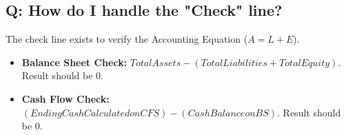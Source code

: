 \documentclass[11pt, letterpaper]{article}
\begin{document}
\subsection{Q: How do I handle the "Check" line?}
The check line exists to verify the Accounting Equation ($A = L + E$).
\begin{itemize}
    \item \textbf{Balance Sheet Check:} $Total Assets - (Total Liabilities + Total Equity)$. Result should be 0.
    \item \textbf{Cash Flow Check:} $(Ending Cash Calculated on CFS) - (Cash Balance on BS)$. Result should be 0.
\end{itemize}
\end{document}
